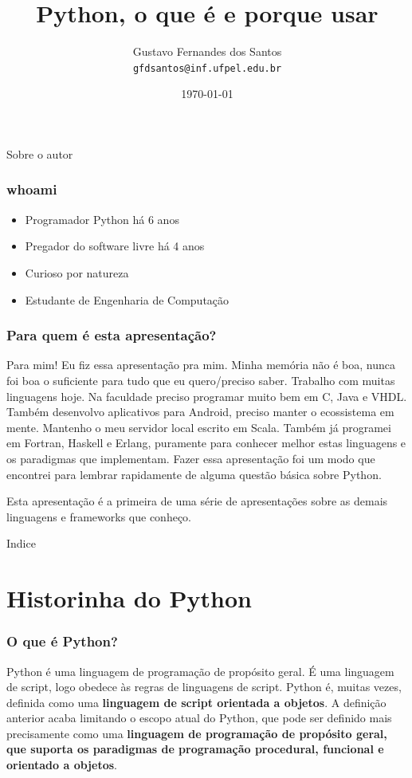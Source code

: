 \documentclass[aspectratio=169]{beamer}
\title{Python, o que é e porque usar}
\author[Gustavo Santos]{Gustavo Fernandes dos Santos \\
\texttt{gfdsantos@inf.ufpel.edu.br}}
\institute{UFPEL - Universidade Federal de Pelotas}
\date{\today}
\begin{document}
\begin{frame}
  \titlepage
\end{frame}

\begin{frame}{Sobre o autor}
    \frametitle{whoami}
    \begin{itemize}
        \item Programador Python há 6 anos
        \item Pregador do software livre há 4 anos
        \item Curioso por natureza
        \item Estudante de Engenharia de Computação
    \end{itemize}
\end{frame}

\begin{frame}
	\frametitle{Para quem é esta apresentação?}
	Para mim! Eu fiz essa apresentação pra mim. Minha memória não é boa, nunca foi boa
o suficiente para tudo que eu quero/preciso saber. Trabalho com muitas linguagens hoje.
Na faculdade preciso programar muito bem em C, Java e VHDL. Também desenvolvo aplicativos
para Android, preciso manter o ecossistema em mente. Mantenho o meu servidor local escrito
em Scala. Também já programei em Fortran, Haskell e Erlang, puramente para conhecer
melhor estas linguagens e os paradigmas que implementam. Fazer essa apresentação foi um modo
que encontrei para lembrar rapidamente de alguma questão básica sobre Python.

	Esta apresentação é a primeira de uma série de apresentações sobre as demais linguagens
e frameworks que conheço.
\end{frame}

\begin{frame}{Indice}
    \tableofcontents
\end{frame}


\section{Historinha do Python}

\begin{frame}
    \frametitle{O que é Python?}
    Python é uma linguagem de programação de propósito geral. É uma linguagem de
script, logo obedece às regras de linguagens de script. Python é,
muitas vezes, definida como uma \textbf{linguagem de script orientada a objetos}. A
definição anterior acaba limitando o escopo atual do Python, que pode ser definido
mais precisamente como uma \textbf{linguagem de programação de propósito geral, que
suporta os paradigmas de programação procedural, funcional e orientado a objetos}.
\end{frame}
\end{document}
